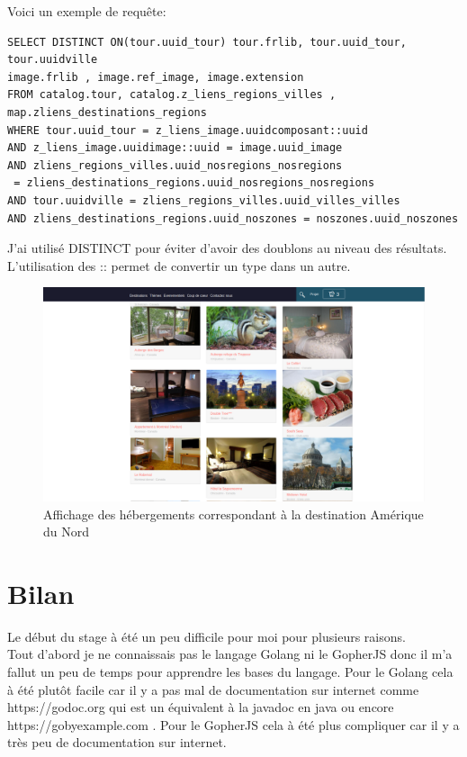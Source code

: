 \documentclass[12pt,a4paper]{report}
\begin{document}
Voici un exemple de requête:

\begin{verbatim}
SELECT DISTINCT ON(tour.uuid_tour) tour.frlib, tour.uuid_tour, tour.uuidville
image.frlib , image.ref_image, image.extension
FROM catalog.tour, catalog.z_liens_regions_villes , 
map.zliens_destinations_regions
WHERE tour.uuid_tour = z_liens_image.uuidcomposant::uuid
AND z_liens_image.uuidimage::uuid = image.uuid_image
AND zliens_regions_villes.uuid_nosregions_nosregions
 = zliens_destinations_regions.uuid_nosregions_nosregions
AND tour.uuidville = zliens_regions_villes.uuid_villes_villes
AND zliens_destinations_regions.uuid_noszones = noszones.uuid_noszones
\end{verbatim}

J'ai utilisé DISTINCT pour éviter d'avoir des doublons au niveau des résultats.
L'utilisation des ::  permet de convertir un type dans un autre.

\newpage

\begin{figure}[h]
\centerline{\includegraphics[scale=0.3]{produit.png}}
\caption{Affichage des hébergements correspondant à la destination Amérique du Nord}
\label{image_hyooper}
\end{figure}

\newpage

\chapter[Bilan]{Bilan}

Le début du stage à été un peu difficile pour moi pour plusieurs raisons.\\

 Tout d'abord je ne connaissais pas le langage Golang ni le GopherJS donc il m'a fallut un peu de temps pour apprendre les bases du langage. Pour le Golang cela à été plutôt facile car il y a pas mal de documentation sur internet comme https://godoc.org qui est un équivalent à la javadoc en java ou encore https://gobyexample.com . Pour le GopherJS cela à été plus compliquer car il y a très peu de documentation sur internet.\\
\end{document}
